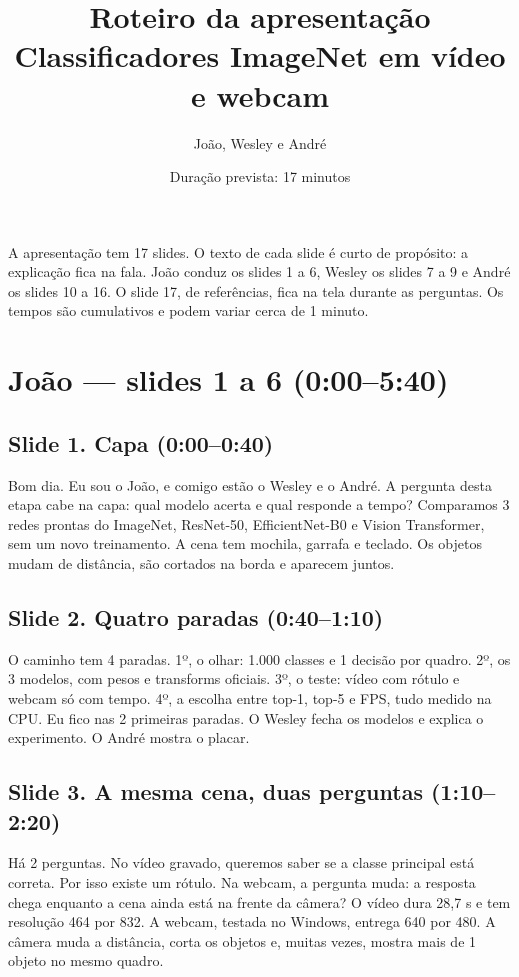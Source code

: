 \documentclass[12pt,a4paper]{article}
\title{Roteiro da apresentação\\Classificadores ImageNet em vídeo e webcam}
\author{João, Wesley e André}
\date{Duração prevista: 17 minutos}
\begin{document}
\maketitle

\noindent
A apresentação tem 17 slides. O texto de cada slide é curto de propósito: a explicação fica na fala.
João conduz os slides 1 a 6, Wesley os slides 7 a 9 e André os slides 10 a 16.
O slide 17, de referências, fica na tela durante as perguntas.
Os tempos são cumulativos e podem variar cerca de 1 minuto.

\section*{João --- slides 1 a 6 (0:00--5:40)}

\subsection*{Slide 1. Capa (0:00--0:40)}

Bom dia. Eu sou o João, e comigo estão o Wesley e o André. A pergunta desta etapa cabe na capa:
qual modelo acerta e qual responde a tempo? Comparamos 3 redes prontas do ImageNet, ResNet-50,
EfficientNet-B0 e Vision Transformer, sem um novo treinamento. A cena tem mochila, garrafa e
teclado. Os objetos mudam de distância, são cortados na borda e aparecem juntos.

\subsection*{Slide 2. Quatro paradas (0:40--1:10)}

O caminho tem 4 paradas. 1º, o olhar: 1.000 classes e 1 decisão por quadro. 2º, os 3 modelos,
com pesos e transforms oficiais. 3º, o teste: vídeo com rótulo e webcam só com tempo. 4º, a
escolha entre top-1, top-5 e FPS, tudo medido na CPU. Eu fico nas 2 primeiras paradas. O Wesley
fecha os modelos e explica o experimento. O André mostra o placar.

\subsection*{Slide 3. A mesma cena, duas perguntas (1:10--2:20)}

Há 2 perguntas. No vídeo gravado, queremos saber se a classe principal está correta. Por isso
existe um rótulo. Na webcam, a pergunta muda: a resposta chega enquanto a cena ainda está na
frente da câmera? O vídeo dura 28,7 s e tem resolução 464 por 832. A webcam, testada no Windows,
entrega 640 por 480. A câmera muda a distância, corta os objetos e, muitas vezes, mostra mais de
1 objeto no mesmo quadro.
\end{document}
